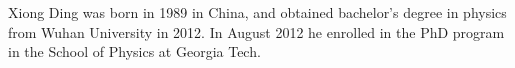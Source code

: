 \renewcommand{\inputfile}{\version\ - edited 2008-06-26 vita}

Xiong Ding was born in 1989 in China, and obtained bachelor's degree
in physics from Wuhan University in 2012. In August 2012 he enrolled in
the PhD program in the School of Physics at Georgia Tech.
